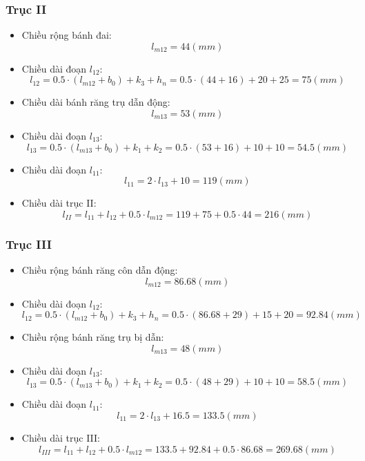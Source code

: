             \subsubsection{Trục II}
                \begin{itemize}
                    \item Chiều rộng bánh đai:
                        $$l_{m12} = 44 (mm)$$   
                    \item Chiều dài đoạn $l_{12}$:
                        $$l_{12} = 0.5 \cdot (l_{m12} + b_0) + k_3 + h_n = 0.5 \cdot (44 + 16) + 20 + 25 = 75 (mm)$$
                    \item Chiều dài bánh răng trụ dẫn động:
                        $$l_{m13} = 53 (mm)$$
                    \item Chiều dài đoạn $l_{13}$:
                        $$l_{13} = 0.5 \cdot (l_{m13} + b_0) + k_1 + k_2 = 0.5 \cdot (53 + 16) + 10 + 10 = 54.5 (mm)$$
                    \item Chiều dài đoạn $l_{11}$:
                        $$l_{11} = 2 \cdot l_{13} + 10 = 119 (mm)$$
                    \item Chiều dài trục II:
                        $$l_{II} = l_{11} + l_{12} + 0.5 \cdot l_{m12} = 119 + 75 + 0.5 \cdot 44 = 216 (mm)$$
                \end{itemize}
            \subsubsection{Trục III}
                \begin{itemize}
                    \item Chiều rộng bánh răng côn dẫn động:
                        $$l_{m12} = 86.68 (mm)$$ 
                    \item Chiều dài đoạn $l_{12}$:
                        $$l_{12} = 0.5 \cdot (l_{m12} + b_0) + k_3 + h_n = 0.5 \cdot (86.68 + 29) + 15 + 20 = 92.84 (mm)$$
                    \item Chiều rộng bánh răng trụ bị dẫn:
                        $$l_{m13} = 48 (mm)$$ 
                    \item Chiều dài đoạn $l_{13}$:
                        $$l_{13} = 0.5 \cdot (l_{m13} + b_0) + k_1 + k_2 = 0.5 \cdot (48 + 29) + 10 + 10 = 58.5 (mm)$$
                    \item Chiều dài đoạn $l_{11}$:
                        $$l_{11} = 2 \cdot l_{13} + 16.5 = 133.5 (mm)$$
                    \item Chiều dài trục III:
                        $$l_{III} = l_{11} + l_{12} + 0.5 \cdot l_{m12} = 133.5 + 92.84 + 0.5 \cdot 86.68 = 269.68 (mm)$$
                \end{itemize}

